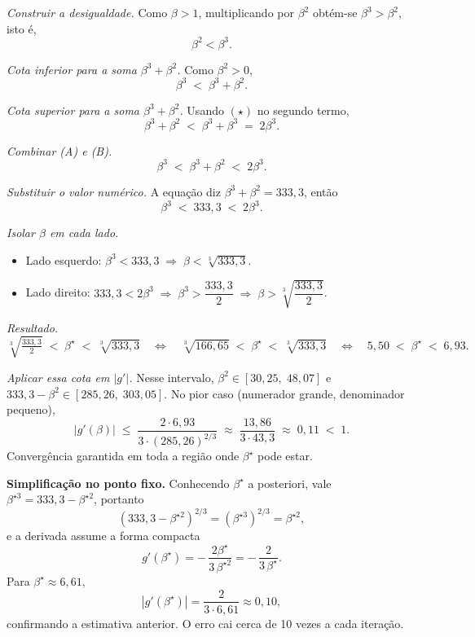 \documentclass[11pt,a4paper]{article}
\begin{document}
\begin{resolucao}
\emph{Construir a desigualdade.} Como $\beta > 1$, multiplicando por $\beta^2$ obtém-se $\beta^3 > \beta^2$, isto é,
\[
  \beta^2 < \beta^3. \tag{$\star$}
\]

\emph{Cota inferior para a soma $\beta^3 + \beta^2$.} Como $\beta^2 > 0$,
\[
  \beta^3 \;<\; \beta^3 + \beta^2. \tag{A}
\]

\emph{Cota superior para a soma $\beta^3 + \beta^2$.} Usando $(\star)$ no segundo termo,
\[
  \beta^3 + \beta^2 \;<\; \beta^3 + \beta^3 \;=\; 2\beta^3. \tag{B}
\]

\emph{Combinar (A) e (B).}
\[
  \beta^3 \;<\; \beta^3 + \beta^2 \;<\; 2\beta^3.
\]

\emph{Substituir o valor numérico.} A equação diz $\beta^3 + \beta^2 = 333{,}3$, então
\[
  \beta^3 \;<\; 333{,}3 \;<\; 2\beta^3.
\]

\emph{Isolar $\beta$ em cada lado.}
\begin{itemize}\itemsep0pt
  \item Lado esquerdo: $\beta^3 < 333{,}3 \;\Longrightarrow\; \beta < \sqrt[3]{333{,}3}$.
  \item Lado direito: $333{,}3 < 2\beta^3 \;\Longrightarrow\; \beta^3 > \dfrac{333{,}3}{2} \;\Longrightarrow\; \beta > \sqrt[3]{\dfrac{333{,}3}{2}}$.
\end{itemize}

\emph{Resultado.}
\[
  \sqrt[3]{\tfrac{333{,}3}{2}} \;<\; \beta^\star \;<\; \sqrt[3]{333{,}3}
  \quad\Longleftrightarrow\quad
  \sqrt[3]{166{,}65} \;<\; \beta^\star \;<\; \sqrt[3]{333{,}3}
  \quad\Longleftrightarrow\quad
  5{,}50 \;<\; \beta^\star \;<\; 6{,}93.
\]

\emph{Aplicar essa cota em $|g'|$.} Nesse intervalo, $\beta^2 \in [30{,}25,\;48{,}07]$ e $333{,}3 - \beta^2 \in [285{,}26,\;303{,}05]$. No pior caso (numerador grande, denominador pequeno),
\[
  |g'(\beta)| \;\le\; \frac{2 \cdot 6{,}93}{3 \cdot (285{,}26)^{2/3}}
              \;\approx\; \frac{13{,}86}{3 \cdot 43{,}3}
              \;\approx\; 0{,}11 \;<\; 1.
\]
Convergência garantida em toda a região onde $\beta^\star$ pode estar.

\textbf{Simplificação no ponto fixo.} Conhecendo $\beta^\star$ a posteriori, vale $\beta^{\star 3} = 333{,}3 - \beta^{\star 2}$, portanto
\[
  (333{,}3 - \beta^{\star 2})^{2/3} = (\beta^{\star 3})^{2/3} = \beta^{\star 2},
\]
e a derivada assume a forma compacta
\[
  g'(\beta^\star) = -\,\frac{2\beta^\star}{3\,\beta^{\star 2}} = -\,\frac{2}{3\,\beta^\star}.
\]
Para $\beta^\star \approx 6{,}61$,
\[
  |g'(\beta^\star)| = \frac{2}{3 \cdot 6{,}61} \approx 0{,}10,
\]
confirmando a estimativa anterior. O erro cai cerca de 10 vezes a cada iteração.


\end{resolucao}
\end{document}
